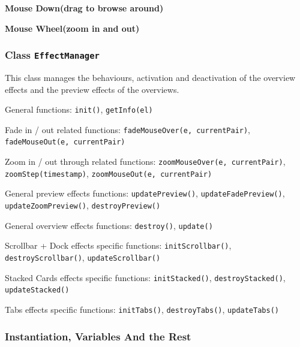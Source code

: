 

\textbf{Mouse Down(drag to browse around)}






\textbf{Mouse Wheel(zoom in and out)}






\subsubsection{Class \texttt{EffectManager}}\label{chap4:effectmanager}

This class manages the behaviours, activation and deactivation of the overview effects and the preview effects of the overviews.

General functions: \texttt{init()}, \texttt{getInfo(el)}

Fade in / out related functions: \texttt{fadeMouseOver(e, currentPair)}, \texttt{fadeMouseOut(e, currentPair)}

Zoom in / out through related functions: \texttt{zoomMouseOver(e, currentPair)}, \texttt{zoomStep(timestamp)}, \texttt{zoomMouseOut(e, currentPair)}

General preview effects functions: \texttt{updatePreview()}, \texttt{updateFadePreview()}, \texttt{updateZoomPreview()}, \texttt{destroyPreview()}

General overview effects functions: \texttt{destroy()}, \texttt{update()}

Scrollbar + Dock effects specific functions: \texttt{initScrollbar()}, \texttt{destroyScrollbar()}, \texttt{updateScrollbar()}

Stacked Cards effects specific functions: \texttt{initStacked()}, \texttt{destroyStacked()}, \texttt{updateStacked()}

Tabs effects specific functions: \texttt{initTabs()}, \texttt{destroyTabs()}, \texttt{updateTabs()}

\subsubsection{Instantiation, Variables And the Rest}

